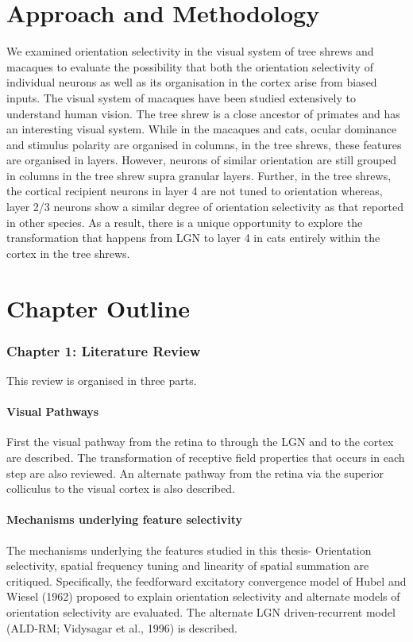 \documentclass [12] {report}
\begin{document}
	\section{Approach and Methodology}
	
	We examined orientation selectivity in the visual system of tree shrews and macaques to evaluate the possibility that both the orientation selectivity of individual neurons as well as its organisation in the cortex arise from biased inputs. The visual system of macaques have been studied extensively to understand human vision. The tree shrew is a close ancestor of primates and has an interesting visual system. While in the macaques and cats, ocular dominance and stimulus polarity are organised in columns, in the tree shrews, these features are organised in layers. However, neurons of similar orientation are still grouped in columns in the tree shrew supra granular layers. Further, in the tree shrews, the cortical recipient neurons in layer 4 are not tuned to orientation whereas, layer 2/3 neurons show a similar degree of orientation selectivity as that reported in other species. As a result, there is a unique opportunity to explore the transformation that happens from LGN to layer 4 in cats entirely within the cortex in the tree shrews. 
	
	\section{Chapter Outline}
	\subsubsection{Chapter 1: Literature Review}
	
	This review is organised in three parts.
	
	\paragraph{Visual Pathways}
	First the visual pathway from the retina to through the LGN and to the cortex are described. The transformation of receptive field properties that occurs in each step are also reviewed. An alternate pathway from the retina via the superior colliculus to the visual cortex is also described.
	
	\paragraph{Mechanisms underlying feature selectivity}
	The mechanisms underlying the features studied in this thesis- Orientation selectivity, spatial frequency tuning and linearity of spatial summation are critiqued. Specifically, the feedforward excitatory convergence model of Hubel and Wiesel (1962) proposed to explain orientation selectivity and alternate models of orientation selectivity are evaluated. The alternate LGN driven-recurrent model (ALD-RM; Vidysagar et al., 1996) is described.
	
\end{document}
